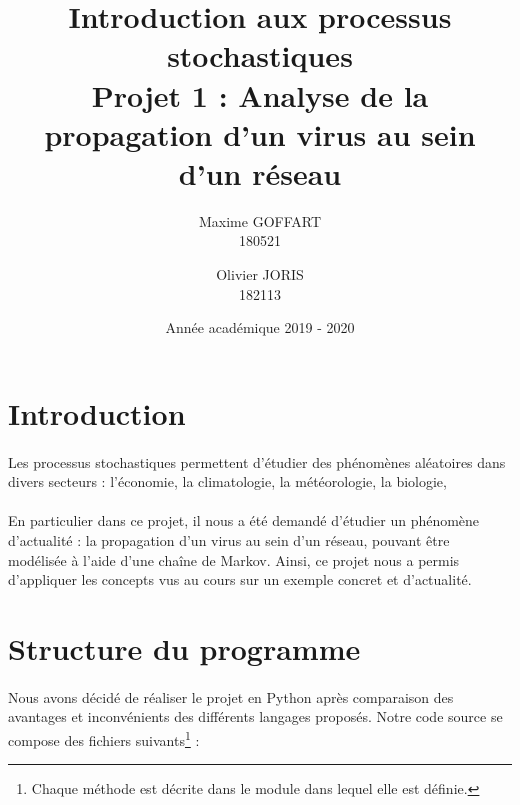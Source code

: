 \documentclass[a4paper, 12pt, oneside]{article}
\title{\textbf{Introduction aux processus stochastiques}\\
	   Projet 1 : Analyse de la propagation d'un virus au sein d'un réseau}
\author{Maxime GOFFART \\180521 \and Olivier JORIS\\182113}
\date{Année académique 2019 - 2020}
\begin{document}
\maketitle
\newpage

\tableofcontents
\newpage

\section{Introduction}

\paragraph{}Les processus stochastiques permettent d'étudier des phénomènes aléatoires dans divers secteurs : l'économie, la climatologie, la météorologie, la biologie, \dotso

\paragraph{}En particulier dans ce projet, il nous a été demandé d'étudier un phénomène d'actualité : la propagation d'un virus au sein d'un réseau, pouvant être modélisée à l'aide d'une chaîne de Markov. Ainsi, ce projet nous a permis d'appliquer les concepts vus au cours sur un exemple concret et d'actualité.

\section{Structure du programme} 
\paragraph{}Nous avons décidé de réaliser le projet en Python après comparaison des avantages et inconvénients des différents langages proposés. Notre code source se compose des fichiers suivants\footnote{Chaque méthode est décrite dans le module dans lequel elle est définie.} :
\end{document}

